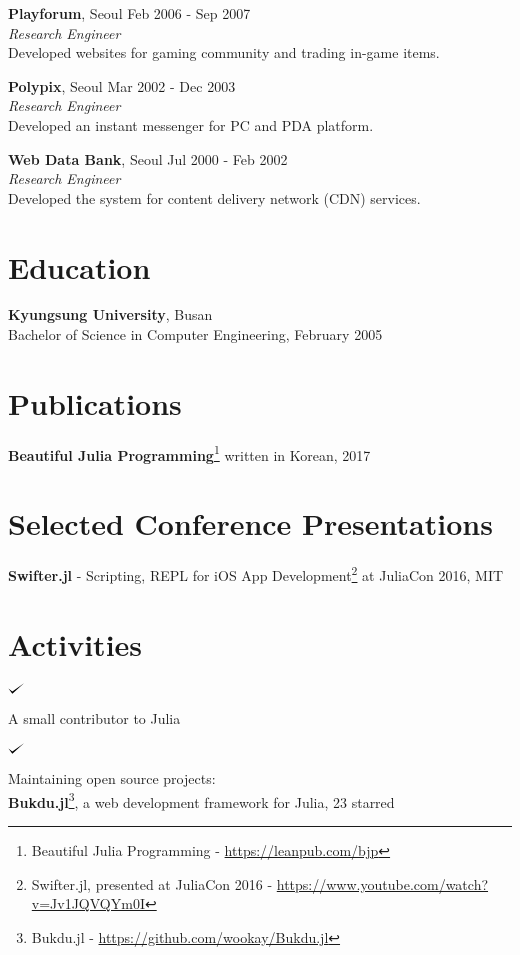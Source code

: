\documentclass[margin,line]{res}
\def\checkmark{\tikz\fill[scale=0.4](0,.35) -- (.25,0) -- (1,.7) -- (.25,.15) -- cycle;}
\newenvironment{list1}{
  \begin{list}{$\checkmark$}{
      \setlength{\parsep}{0in} \setlength{\parskip}{0.3cm}
      \setlength{\topsep}{0in} \setlength{\partopsep}{0.3cm}
      \setlength{\leftmargin}{0.2in}}}{\end{list}}
\begin{document}
\begin{resume}
{\bf Playforum}, Seoul \hfill Feb 2006 - Sep 2007 \\
{\em Research Engineer} \\
Developed websites for gaming community and trading in-game items.

{\bf Polypix}, Seoul \hfill Mar 2002 - Dec 2003 \\
{\em Research Engineer} \\
Developed an instant messenger for PC and PDA platform.

{\bf Web Data Bank}, Seoul \hfill Jul 2000 - Feb 2002 \\
{\em Research Engineer} \\
Developed the system for content delivery network (CDN) services.


\section{\sc Education}
{\bf Kyungsung University}, Busan \\
Bachelor of Science in Computer Engineering, February 2005


\section{\sc Publications}
{\bf Beautiful Julia Programming}\footnote{ Beautiful Julia Programming - \url{https://leanpub.com/bjp}} written in Korean, 2017


\section{\sc Selected Conference Presentations}
{\bf Swifter.jl} - Scripting, REPL for iOS App Development\footnote{ Swifter.jl, presented at JuliaCon 2016 - \url{https://www.youtube.com/watch?v=Jv1JQVQYm0I}} at JuliaCon 2016, MIT

\vspace{1.5cm}

\section{\sc Activities}

\vspace{-0.1cm}

\begin{list1}
\item A small contributor to Julia
\end{list1}

\begin{list1}
\item Maintaining open source projects: \\
  {\bf Bukdu.jl}\footnote{ Bukdu.jl - \url{https://github.com/wookay/Bukdu.jl}}, a web development framework for Julia, 23 starred


\end{list1}
\end{resume}
\end{document}
